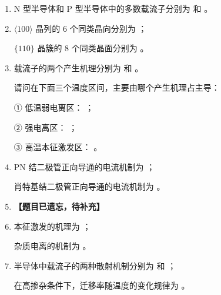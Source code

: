 \documentclass[UTF8,a4paper,12pt]{ctexart}
\begin{document}
	\begin{enumerate}[label=\arabic*.,leftmargin=2.2em,itemsep=0.7em]
		
		\item N 型半导体和 P 型半导体中的多数载流子分别为
		\underline{\hspace{2.5cm}} 和
		\underline{\hspace{2.5cm}}。
		
		\item $\langle 100\rangle$ 晶列的 6 个同类晶向分别为
		\underline{\hspace{8cm}}；
		
		$\{110\}$ 晶簇的 8 个同类晶面分别为
		\underline{\hspace{8cm}}。
		
		\item 载流子的两个产生机理分别为
		\underline{\hspace{2.5cm}} 和
		\underline{\hspace{2.5cm}}。
		
		请问在下面三个温度区间，主要由哪个产生机理占主导：
		
		① 低温弱电离区：
		\underline{\hspace{3cm}}；
		
		② 强电离区：
		\underline{\hspace{3cm}}；
		
		③ 高温本征激发区：
		\underline{\hspace{3cm}}。
		
		\item PN 结二极管正向导通的电流机制为
		\underline{\hspace{4cm}}；
		
		肖特基结二极管正向导通的电流机制为
		\underline{\hspace{4cm}}。
		
		\item \textbf{【题目已遗忘，待补充】}
		
		\item 本征激发的机理为
		\underline{\hspace{4cm}}；
		
		杂质电离的机制为
		\underline{\hspace{4cm}}。
		
		\item 半导体中载流子的两种散射机制分别为
		\underline{\hspace{3cm}} 和
		\underline{\hspace{3cm}}；
		
		在高掺杂条件下，迁移率随温度的变化规律为
		\underline{\hspace{5cm}}。
		

\end{enumerate}
\end{document}
